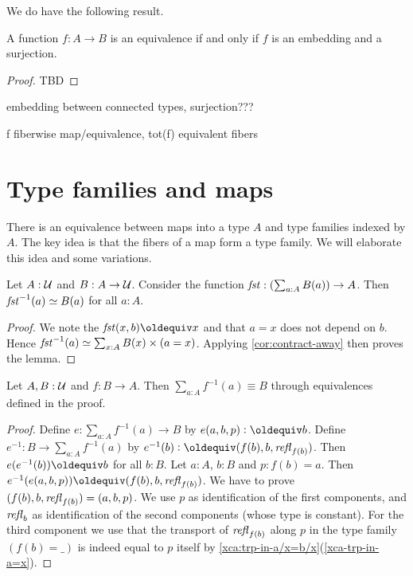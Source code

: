 \begin{definition}
\begin{definition}
\end{definition}

We do have the following result.

\begin{lemma}\label{lem:emb+surj}
A function $f: A\to B$ is an equivalence 
if and only if $f$ is an embedding and a surjection.
\end{lemma}

\begin{proof}
TBD
\end{proof}

embedding between connected types, surjection???

f fiberwise map/equivalence, tot(f) equivalent fibers

\section{Type families and maps}
\label{sec:typefam}

There is an equivalence between maps into a type $A$
and type families indexed by $A$. The key idea is that the
fibers of a map form a type family. We will elaborate this
idea and some variations.


\begin{lemma}\label{lem:fst-fiber(a)=B(a)}
Let $A:\mathcal{U}$ and $B:A\to\mathcal{U}$.
Consider the function $\mathop{\mathit{fst}}: (\sum_{a:A} B(a))\to A$.
Then $\mathop{\mathit{fst}}^{-1}(a) \simeq B(a)$ for all $a:A$.
\end{lemma}
\begin{proof}
We note the $\fst(x,b)\jdeq x$ and that $a=x$ does
not depend on $b$. Hence
$\mathop{\mathit{fst}}^{-1}(a) \simeq \sum_{x:A}  B(x) \times (a=x)$.
Applying \cref{cor:contract-away} then proves the lemma.
\end{proof}

\begin{lemma}\label{lem:sum-of-fibers}
Let $A,B:\mathcal{U}$ and $f:B\to A$. 
Then $\sum_{a:A} f^{-1}(a)\equiv B$ through equivalences
defined in the proof.
\end{lemma}
\begin{proof}
Define $e: \sum_{a:A} f^{-1}(a) \to B$ by $e(a,b,p)\defeq b$.
Define $e^{-1}: B \to \sum_{a:A} f^{-1}(a)$ by 
$e^{-1}(b)\defeq (f(b),b,\refl{f(b)})$.
Then $e(e^{-1}(b))\jdeq b$ for all $b:B$.
Let $a:A$, $b:B$ and $p: f(b)=a$.
Then $e^{-1}(e(a,b,p))\jdeq (f(b),b,\refl{f(b)})$.
We have to prove $(f(b),b,\mathop{{\it refl}_{f(b)}})=(a,b,p)$.
We use $p$ as identification of the first components,
and $\mathop{{\it refl}_{b}}$ as identification of the second components
(whose type is constant). For the third component
we use that the transport of $\mathop{{\it refl}_{f(b)}}$ along $p$
in the type family $(f(b)=\_)$ is indeed equal to $p$
itself by \cref{xca:trp-in-a/x=b/x}(\ref{xca-trp-in-a=x}).
\end{proof}



\end{definition}
